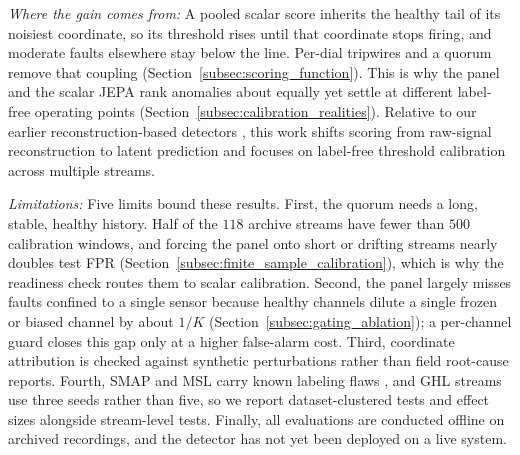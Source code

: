 \documentclass[journal]{IEEEtran}
\begin{document}
\noindent\emph{Where the gain comes from:} A pooled scalar score inherits the healthy tail of its noisiest coordinate, so its threshold rises until that coordinate stops firing, and moderate faults elsewhere stay below the line. Per-dial tripwires and a quorum remove that coupling (Section~\ref{subsec:scoring_function}). This is why the panel and the scalar JEPA rank anomalies about equally yet settle at different label-free operating points (Section~\ref{subsec:calibration_realities}). Relative to our earlier reconstruction-based detectors \cite{akbarian2023aelstm, akbarian2024aekmeans}, this work shifts scoring from raw-signal reconstruction to latent prediction and focuses on label-free threshold calibration across multiple streams.

\noindent\emph{Limitations:} Five limits bound these results. First, the quorum needs a long, stable, healthy history. Half of the $118$ archive streams have fewer than $500$ calibration windows, and forcing the panel onto short or drifting streams nearly doubles test FPR (Section~\ref{subsec:finite_sample_calibration}), which is why the readiness check routes them to scalar calibration. Second, the panel largely misses faults confined to a single sensor because healthy channels dilute a single frozen or biased channel by about $1/K$ (Section~\ref{subsec:gating_ablation}); a per-channel guard closes this gap only at a higher false-alarm cost. Third, coordinate attribution is checked against synthetic perturbations rather than field root-cause reports. Fourth, SMAP and MSL carry known labeling flaws \cite{wu2023flawed}, and GHL streams use three seeds rather than five, so we report dataset-clustered tests and effect sizes alongside stream-level tests. Finally, all evaluations are conducted offline on archived recordings, and the detector has not yet been deployed on a live system.

\vspace{-4pt}
\end{document}
